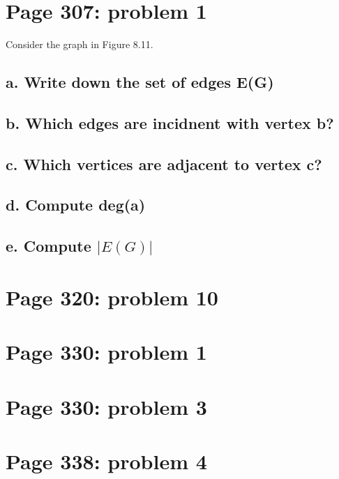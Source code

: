 \documentclass[]{article}
\begin{document}
\section{Page 307: problem 1}\label{page-307-problem-1}

Consider the graph in Figure 8.11.

\subsection{a. Write down the set of edges
E(G)}\label{a.-write-down-the-set-of-edges-eg}

\subsection{b. Which edges are incidnent with vertex
b?}\label{b.-which-edges-are-incidnent-with-vertex-b}

\subsection{c. Which vertices are adjacent to vertex
c?}\label{c.-which-vertices-are-adjacent-to-vertex-c}

\subsection{d. Compute deg(a)}\label{d.-compute-dega}

\subsection{\texorpdfstring{e. Compute
\(|E(G)|\)}{e. Compute \textbar{}E(G)\textbar{}}}\label{e.-compute-eg}

\section{Page 320: problem 10}\label{page-320-problem-10}

\section{Page 330: problem 1}\label{page-330-problem-1}

\section{Page 330: problem 3}\label{page-330-problem-3}

\section{Page 338: problem 4}\label{page-338-problem-4}
\end{document}
